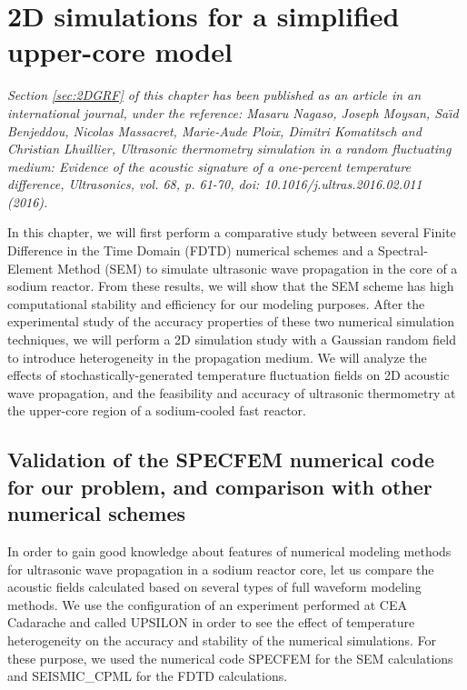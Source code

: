 
\chapter{2D simulations for a simplified upper-core model}

\label{chap:3}
\vspace*{-12mm}
{\footnotesize \sl
Section \ref{sec:2DGRF} of this chapter has been published as an article in an international journal, under the reference: Masaru Nagaso, Joseph Moysan, Sa\"{\i}d Benjeddou, Nicolas
Massacret, Marie-Aude Ploix, Dimitri Komatitsch and Christian Lhuillier, Ultrasonic thermometry simulation in a random fluctuating medium: Evidence of the
acoustic signature of a one-percent temperature difference, Ultrasonics, vol. 68, p. 61-70, doi: 10.1016/j.ultras.2016.02.011 (2016).}

\vspace*{+2mm}
    In this chapter, we will first perform a comparative study between several Finite Difference in the Time Domain (FDTD) numerical schemes and a Spectral-Element Method (SEM)
to simulate ultrasonic wave propagation in the core of a sodium reactor. From these results, we will show that
the SEM scheme has high computational stability and efficiency for our modeling purposes.
    After the experimental study of the accuracy properties of these two numerical simulation techniques,
we will perform a 2D simulation study with a Gaussian random field to introduce heterogeneity in the propagation medium.
We will analyze the effects of stochastically-generated
temperature fluctuation fields on 2D acoustic wave propagation, and the feasibility and accuracy of ultrasonic thermometry at the upper-core region of a sodium-cooled fast reactor.

    \section{Validation of the SPECFEM numerical code for our problem, and comparison with other numerical schemes}
    \label{sec:UPSILON}

\vspace*{-3mm}
        In order to gain good knowledge about features of numerical modeling methods for ultrasonic wave propagation in a sodium reactor core, let us compare the acoustic fields
calculated based on several types of full waveform modeling methods. We use the configuration of an experiment performed at CEA Cadarache and called UPSILON in order to see the effect of temperature heterogeneity on the
accuracy and stability of the numerical simulations. For these purpose, we used the numerical code SPECFEM for the SEM calculations and SEISMIC\_CPML for the FDTD
calculations.

